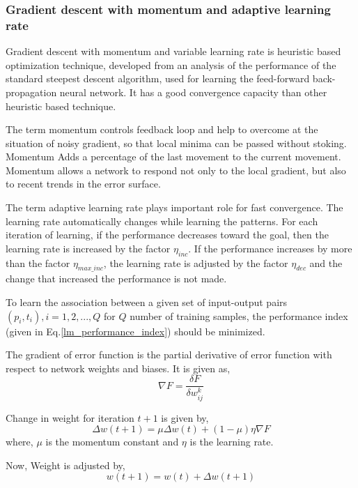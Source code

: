 \subsubsection{Gradient descent with momentum and adaptive learning rate}
\label{section_gdma}
Gradient descent with momentum and variable learning rate is heuristic based optimization technique, developed from an analysis of the performance of the standard steepest descent algorithm, used for learning the feed-forward back-propagation neural network. It has a good convergence capacity than other heuristic based technique.


The term momentum controls feedback loop and help to overcome at the situation of noisy gradient, so that local minima can be passed without stoking. Momentum Adds a percentage of the last movement to the current movement. Momentum allows a network to respond not only to the local gradient, but also to recent trends in the error surface.

The term adaptive learning rate plays important role for fast convergence. The learning rate automatically changes while learning the patterns. For each iteration of learning, if the performance decreases toward the goal, then the learning rate is increased by the factor $\eta_{inc}$. If the performance increases by more than the factor $\eta_{max\_inc}$, the learning rate is adjusted by the factor $\eta_{dec}$ and the change that increased the performance is not made.

To learn the association between a given set of input-output pairs ${(p_i,t_i), i=1,2,...,Q}$ for $Q$ number of training samples, the performance index (given in Eq.\ref{lm_performance_index}) should be minimized.

The gradient of error function is the partial derivative of error function with respect to network weights and biases. It is given as,
\begin{equation}\label{equation_gradient_of_error}
\nabla{F}=\frac{\delta F }{\delta  w^k_{ij}}
\end{equation}

Change in weight for iteration $t+1$ is given by,
\begin{equation}\label{equation_gdma}
\Delta w(t+1)=\mu \Delta w(t) + (1-\mu)\eta \nabla{F}
\end{equation}
where, $\mu$ is the momentum constant and $\eta$ is the learning rate.

Now, Weight is adjusted by,
\begin{equation}\label{equation_gdma}
w(t+1)=w(t) + \Delta w(t+1)
\end{equation}

